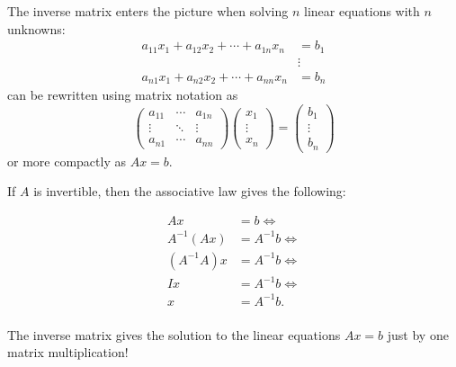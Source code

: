 \documentclass{article}
\begin{document}
The inverse matrix enters the picture when solving $n$ linear
equations with $n$ unknowns:
\begin{align*}
a_{11}x_1 + a_{12} x_2 + \cdots + a_{1n} x_n &= b_1\\
&\vdots\\
a_{n1} x_1 + a_{n2} x_2 + \cdots + a_{nn} x_n &= b_n
\end{align*}
can be rewritten using matrix notation as 
$$
\begin{pmatrix}
a_{11} &  \cdots & a_{1 n} \\
\vdots & \ddots & \vdots\\
a_{n1} & \cdots & a_{n n}
\end{pmatrix}
\begin{pmatrix}
x_1 \\ \vdots \\ x_n
\end{pmatrix}
= 
\begin{pmatrix}
b_1 \\ \vdots \\ b_n
\end{pmatrix}
$$
or more compactly as $A x = b$.



If $A$ is invertible, then the associative law gives the following:
\label{ainvsol}
\begin{frameit}
\begin{align*}
A x &= b \iff\\
 A^{-1}  \left(A x\right) &= A^{-1} b \iff \\
(A^{-1} A) x &= A^{-1} b \iff\\
I x &= A^{-1} b\iff\\
x &= A^{-1} b.\\ 
\end{align*}
\end{frameit}

The inverse matrix gives the solution to the linear equations $A x = b$ just by one matrix multiplication!
\end{document}
